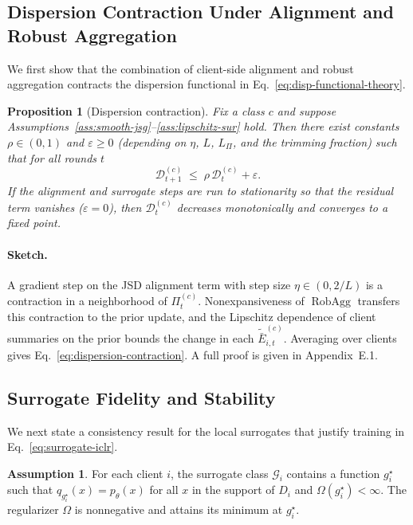 \documentclass{article}
\theoremstyle{plain}
\newtheorem{proposition}[theorem]{Proposition}
\theoremstyle{definition}
\newtheorem{assumption}[theorem]{Assumption}
\theoremstyle{remark}
\begin{document}
\subsection{Dispersion Contraction Under Alignment and Robust Aggregation}

We first show that the combination of client-side alignment and robust
aggregation contracts the dispersion functional in Eq.~\eqref{eq:disp-functional-theory}.

\begin{proposition}[Dispersion contraction]
\label{prop:dispersion-contraction}
Fix a class $c$ and suppose
Assumptions~\ref{ass:smooth-jsg}--\ref{ass:lipschitz-sur} hold.
Then there exist constants $\rho \in (0,1)$ and $\varepsilon \ge 0$
(depending on $\eta$, $L$, $L_{\Pi}$, and the trimming fraction) such that
for all rounds $t$
\begin{equation}
\label{eq:dispersion-contraction}
\mathcal{D}^{(c)}_{t+1}
\;\le\; \rho\,\mathcal{D}^{(c)}_{t} + \varepsilon.
\end{equation}
If the alignment and surrogate steps are run to stationarity so that the
residual term vanishes ($\varepsilon = 0$), then
$\mathcal{D}^{(c)}_{t}$ decreases monotonically and converges to a fixed point.
\end{proposition}

\paragraph{Sketch.}
A gradient step on the JSD alignment term with step size
$\eta \in (0,2/L)$ is a contraction in a neighborhood of $\Pi^{(c)}_t$.
Nonexpansiveness of $\operatorname{RobAgg}$ transfers this contraction to the
prior update, and the Lipschitz dependence of client summaries on the prior
bounds the change in each $\tilde{\bar{E}}^{(c)}_{i,t}$. Averaging over
clients gives Eq.~\eqref{eq:dispersion-contraction}. A full proof is given
in Appendix~E.1.

\subsection{Surrogate Fidelity and Stability}

We next state a consistency result for the local surrogates that justify
training in Eq.~\eqref{eq:surrogate-iclr}.

\begin{assumption}
\label{ass:surrogate-class}
For each client $i$, the surrogate class $\mathcal{G}_i$ contains a function
$g_i^\star$ such that
$q_{g_i^\star}(x) = p_\theta(x)$ for all $x$ in the support of $D_i$ and
$\Omega(g_i^\star) < \infty$. The regularizer $\Omega$ is nonnegative and
attains its minimum at $g_i^\star$.
\end{assumption}
\end{document}
